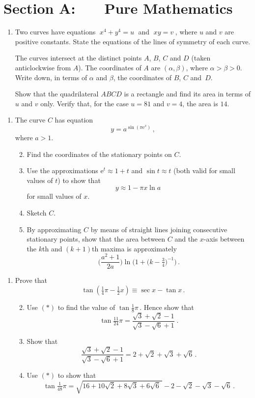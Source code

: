 \documentclass[a4, 11pt]{report}
\newlength{\qspace}
\newcounter{qnumber}
\newenvironment{question}%
 {\vspace{\qspace}
  \begin{enumerate}[\bfseries 1\quad][10]%
    \setcounter{enumi}{\value{qnumber}}%
    \item%
 }
{
  \end{enumerate}
  \filbreak
  \stepcounter{qnumber}
 }
\newenvironment{questionparts}[1][1]%
 {
  \begin{enumerate}[\bfseries (i)]%
    \setcounter{enumii}{#1}
    \addtocounter{enumii}{-1}
    \setlength{\itemsep}{5mm}
    \setlength{\parskip}{8pt}
 }
 {
  \end{enumerate}
 }
\def\e{{\mathrm e}}
\begin{document}
\setcounter{page}{2}

 
\section*{Section A: \ \ \ Pure Mathematics}

\begin{question}
Two curves have equations 
$\; x^4+y^4=u\;$ and $\; xy = v\;$, where $u$ and $v$ are positive
constants. State the equations of the lines of symmetry of each curve.

 The curves 
intersect at the distinct points $A$, $B$, $C$ and $D$
(taken anticlockwise from $A$).
The coordinates of $A$ are $(\alpha,\beta)$,
where $\alpha>\beta>0$. Write down, in terms of 
$\alpha$ and $\beta$, the coordinates of
$B$, $C$ and~$D$. 


Show that the quadrilateral $ABCD$ is a rectangle and find its area
in terms of $u$ and $v$ only. Verify that, for the case
$u=81$ and $v=4$, the area is $14$.
\end{question}

\begin{question}
The curve $C$ has equation
\[
y= a^{\sin (\pi \e^ x)}\,,
\]
where $a>1$.

\begin{questionparts}
\item Find the coordinates of the stationary points on $C$.

\item Use the approximations $\e^t \approx 1+t$ and $\sin t \approx t$ 
(both valid for small values of $t$) 
 to show that 
\[
y\approx 1-\pi x \ln a \;
\]
for small values of $x$.

\item Sketch $C$.

\item By approximating $C$ by means of straight lines joining consecutive
stationary points, show that the area between $C$ and the $x$-axis
between the $k$th and $(k+1)$th maxima is approximately
\[
\Big( \frac {a^2+1}{2a} \Big)
\ln \Big ( 1+ \big( k-\tfrac34)^{-1} \Big)\,.
\]
\end{questionparts}
\end{question}

\begin{question}
Prove that          
\[
\tan \left ( \tfrac14 \pi -\tfrac12 x \right)\equiv \sec x -\tan x\,.
\tag{$*$}
\]

\begin{questionparts}
\item Use $(*)$ to find the value of        
$\tan\frac18\pi\,$. Hence show that 
\[
\tan \tfrac{11}{24} \pi = \frac{\sqrt3 + \sqrt2 -1}{\sqrt3
  -\sqrt6+1}\;.
\]

\item Show that 
\[
 \frac{\sqrt3 + \sqrt2 -1}{\sqrt3
  -\sqrt6+1}= 2+\sqrt2+\sqrt3+\sqrt6\,.
\]


\item Use $(*)$ to show that
\[
\tan \tfrac1{48}\pi = 
\sqrt{16+10\sqrt2+8\sqrt3 +6\sqrt6 \ }-2-\sqrt2-\sqrt3-\sqrt6\,.
\]
\end{questionparts}
\end{question}
\end{document}
